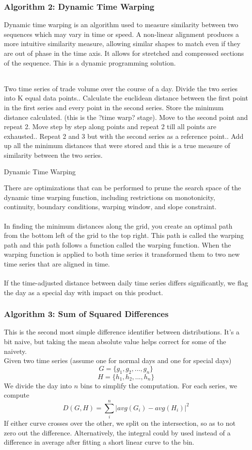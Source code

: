 \documentclass[11pt]{article}
\begin{document}
\subsubsection*{Algorithm 2: Dynamic Time Warping}
Dynamic time warping is an algorithm used to measure similarity between two sequences which may vary in time or speed. A non-linear alignment produces a more intuitive similarity measure, allowing similar shapes to match even if they are out of phase in the time axis. It allows for stretched and compressed sections of the sequence. This is a dynamic programming solution. 
\\\\
\begin{algorithm}[H]
\SetAlgoLined
{}
 Two time series of trade volume over the course of a day. Divide the two series into K equal data points.. Calculate the euclidean distance between the first point in the first series and every point in the second series. Store the minimum distance calculated. (this is the ?time warp? stage). Move to the second point and repeat 2. Move step by step along points and repeat 2 till all points are exhausted.. Repeat 2 and 3 but with the second series as a reference point.. Add up all the minimum distances that were stored and this is a true measure of similarity between the two series.\;
 \caption{Dynamic Time Warping}
\end{algorithm}
There are optimizations that can be performed to prune the search space of the dynamic time warping function, including restrictions on monotonicity, continuity, boundary conditions, warping window, and slope constraint. 
\\\\In finding the minimum distances along the grid, you create an optimal path from the bottom left of the grid to the top right. This path is called the warping path and this path follows a function called the warping function. When the warping function is applied to both time series it transformed them to two new time series that are aligned in time.
\\\\If the time-adjusted distance between daily time series differs significantly, we flag the day as a special day with impact on this product.

\subsubsection*{Algorithm 3: Sum of Squared Differences}
This is the second most simple difference identifier between distributions. It's a bit naive, but taking the mean absolute value helps correct for some of the naivety.
\\Given two time series (assume one for normal days and one for special days)
$$G = \{g_1, g_2, ..., g_n\}$$
$$H = \{h_1, h_2, ..., h_n\}$$
We divide the day into $n$ bins to simplify the computation. 
For each series, we compute 
$$D(G,H) = \sum_i^n |avg(G_i)-avg(H_i)|^2$$
If either curve crosses over the other, we split on the intersection, so as to not zero out the difference. Alternatively, the integral could by used instead of a difference in average after fitting a short linear curve to the bin.
\end{document}
